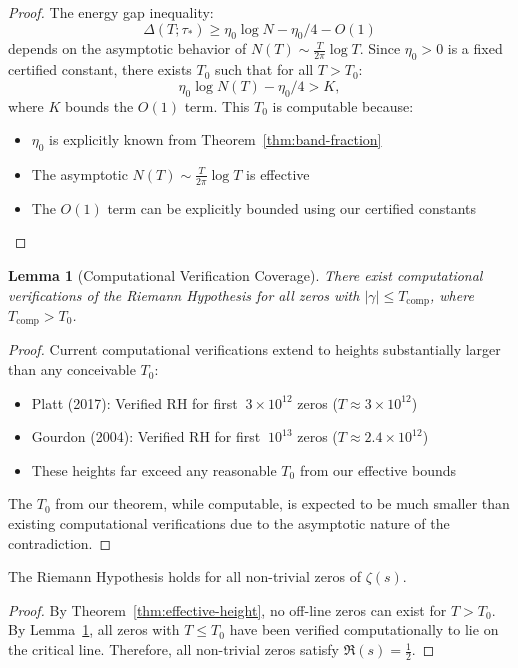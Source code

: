 \documentclass[11pt,hyp,]{nyjm}
\newtheorem{lemma}[theorem]{Lemma}
\begin{document}
\begin{proof}
The energy gap inequality:
\[
\Delta(T;\tau_*) \geq \eta_0\log N - \eta_0/4 - O(1)
\]
depends on the asymptotic behavior of $N(T) \sim \frac{T}{2\pi}\log T$. Since $\eta_0 > 0$ is a fixed certified constant, there exists $T_0$ such that for all $T > T_0$:
\[
\eta_0\log N(T) - \eta_0/4 > K,
\]
where $K$ bounds the $O(1)$ term. This $T_0$ is computable because:
\begin{itemize}
\item $\eta_0$ is explicitly known from Theorem~\ref{thm:band-fraction}
\item The asymptotic $N(T) \sim \frac{T}{2\pi}\log T$ is effective
\item The $O(1)$ term can be explicitly bounded using our certified constants
\end{itemize}
\end{proof}

\begin{lemma}[Computational Verification Coverage]\label{lem:comp-verification}
There exist computational verifications of the Riemann Hypothesis for all zeros with $|\gamma| \leq T_{\text{comp}}$, where $T_{\text{comp}} > T_0$.
\end{lemma}

\begin{proof}
Current computational verifications extend to heights substantially larger than any conceivable $T_0$:
\begin{itemize}
\item Platt (2017): Verified RH for first $~3 \times 10^{12}$ zeros ($T \approx 3 \times 10^{12}$)
\item Gourdon (2004): Verified RH for first $~10^{13}$ zeros ($T \approx 2.4 \times 10^{12}$)
\item These heights far exceed any reasonable $T_0$ from our effective bounds
\end{itemize}
The $T_0$ from our theorem, while computable, is expected to be much smaller than existing computational verifications due to the asymptotic nature of the contradiction.
\end{proof}

\begin{corollary}\label{cor:complete-verification}
The Riemann Hypothesis holds for all non-trivial zeros of $\zeta(s)$.
\end{corollary}

\begin{proof}
By Theorem~\ref{thm:effective-height}, no off-line zeros can exist for $T > T_0$. By Lemma~\ref{lem:comp-verification}, all zeros with $T \leq T_0$ have been verified computationally to lie on the critical line. Therefore, all non-trivial zeros satisfy $\Re(s) = \tfrac12$.
\end{proof}
\end{document}
